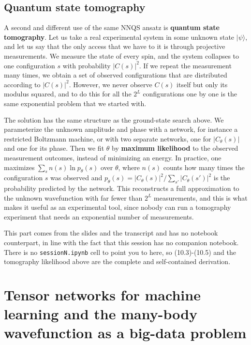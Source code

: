 

\subsection{Quantum state tomography}

A second and different use of the same NNQS ansatz is \textbf{quantum state tomography}. Let us
take a real experimental system in some unknown state $|\psi\rangle$, and let us say that the only
access that we have to it is through projective measurements. We measure the state of every spin,
and the system collapses to one configuration $s$ with probability $|C(s)|^2$. If we repeat the
measurement many times, we obtain a set of observed configurations that are distributed according
to $|C(s)|^2$. However, we never observe $C(s)$ itself but only its modulus squared, and to do
this for all the $2^L$ configurations one by one is the same exponential problem that we started
with.

The solution has the same structure as the ground-state search above. We parameterize the unknown
amplitude and phase with a network, for instance a restricted Boltzmann machine, or with two
separate networks, one for $|C_\theta(s)|$ and one for its phase. Then we fit $\theta$ by
\textbf{maximum likelihood} to the observed measurement outcomes, instead of minimizing an energy.
In practice, one maximizes $\sum_{s} n(s) \ln p_\theta(s)$ over $\theta$, where $n(s)$ counts how
many times the configuration $s$ was observed and $p_\theta(s) =
|C_\theta(s)|^2/\sum_{s'}|C_\theta(s')|^2$ is the probability predicted by the network. This
reconstructs a full approximation to the unknown wavefunction with far fewer than $2^L$
measurements, and this is what makes it useful as an experimental tool, since nobody can run a
tomography experiment that needs an exponential number of measurements.

This part comes from the slides and the transcript and has no notebook counterpart, in line with
the fact that this session has no companion notebook. There is no \texttt{sessionN.ipynb} cell to
point you to here, so (10.3)-(10.5) and the tomography likelihood above are the complete and
self-contained derivation.

\section{Tensor networks for machine learning and the many-body wavefunction as a big-data problem}

